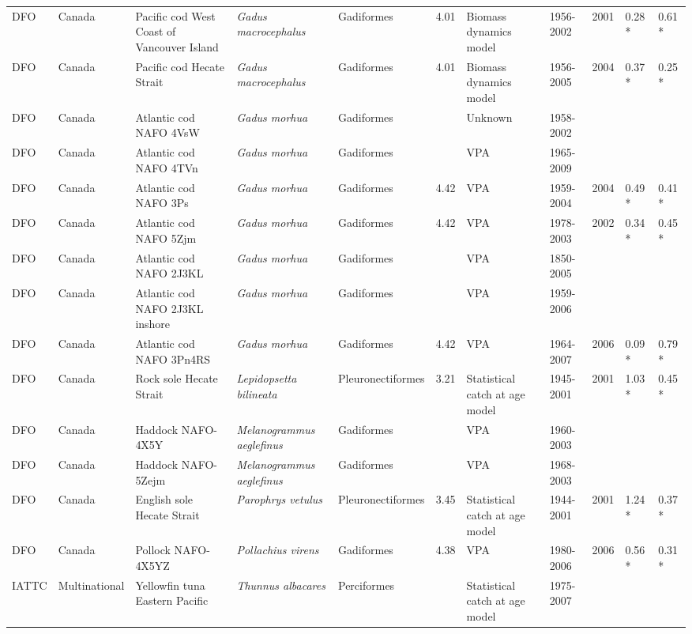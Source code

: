 \begin{longtable}{p{1.5cm}p{1.5cm}p{3cm}p{3cm}p{2.5cm}p{0.9cm}p{1.4cm}p{0.9cm}p{0.9cm}p{0.9cm}p{1cm}}
  DFO & Canada & Pacific cod West Coast of Vancouver Island & \textit{Gadus macrocephalus} & Gadiformes & 4.01 & Biomass dynamics model & 1956-2002 & 2001 & 0.28 * & 0.61 * \\ 
  DFO & Canada & Pacific cod Hecate Strait & \textit{Gadus macrocephalus} & Gadiformes & 4.01 & Biomass dynamics model & 1956-2005 & 2004 & 0.37 * & 0.25 * \\ 
  DFO & Canada & Atlantic cod NAFO 4VsW & \textit{Gadus morhua} & Gadiformes &  & Unknown & 1958-2002 &  &  &  \\ 
  DFO & Canada & Atlantic cod NAFO 4TVn & \textit{Gadus morhua} & Gadiformes &  & VPA & 1965-2009 &  &  &  \\ 
  DFO & Canada & Atlantic cod NAFO 3Ps & \textit{Gadus morhua} & Gadiformes & 4.42 & VPA & 1959-2004 & 2004 & 0.49 * & 0.41 * \\ 
  DFO & Canada & Atlantic cod NAFO 5Zjm & \textit{Gadus morhua} & Gadiformes & 4.42 & VPA & 1978-2003 & 2002 & 0.34 * & 0.45 * \\ 
  DFO & Canada & Atlantic cod NAFO 2J3KL & \textit{Gadus morhua} & Gadiformes &  & VPA & 1850-2005 &  &  &  \\ 
  DFO & Canada & Atlantic cod NAFO 2J3KL inshore & \textit{Gadus morhua} & Gadiformes &  & VPA & 1959-2006 &  &  &  \\ 
  DFO & Canada & Atlantic cod NAFO 3Pn4RS & \textit{Gadus morhua} & Gadiformes & 4.42 & VPA & 1964-2007 & 2006 & 0.09 * & 0.79 * \\ 
  DFO & Canada & Rock sole Hecate Strait & \textit{Lepidopsetta bilineata} & Pleuronectiformes & 3.21 & Statistical catch at age model & 1945-2001 & 2001 & 1.03 * & 0.45 * \\ 
  DFO & Canada & Haddock NAFO-4X5Y & \textit{Melanogrammus aeglefinus} & Gadiformes &  & VPA & 1960-2003 &  &  &  \\ 
  DFO & Canada & Haddock NAFO-5Zejm & \textit{Melanogrammus aeglefinus} & Gadiformes &  & VPA & 1968-2003 &  &  &  \\ 
  DFO & Canada & English sole Hecate Strait & \textit{Parophrys vetulus} & Pleuronectiformes & 3.45 & Statistical catch at age model & 1944-2001 & 2001 & 1.24 * & 0.37 * \\ 
  DFO & Canada & Pollock NAFO-4X5YZ & \textit{Pollachius virens} & Gadiformes & 4.38 & VPA & 1980-2006 & 2006 & 0.56 * & 0.31 * \\ 
  IATTC & Multinational & Yellowfin tuna Eastern Pacific & \textit{Thunnus albacares} & Perciformes &  & Statistical catch at age model & 1975-2007 &  &  &  \\ 

\end{longtable}
